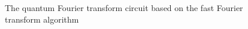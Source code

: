 \begin{figure}

\caption{
  The quantum Fourier transform circuit based on the fast
  Fourier transform algorithm
}
\label{figQuantCompQuantFourier}
\end{figure}
